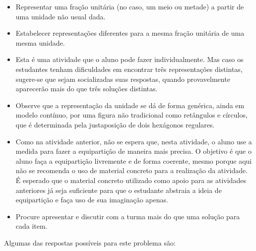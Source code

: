 \begin{atividade}\label{chap1-ativ9}
\objetivos
\begin{itemize} %
    \item       Representar uma fração unitária (no caso, um meio ou metade) a partir de uma unidade não usual dada.
    \item       Estabelecer representações diferentes para a mesma fração unitária de uma mesma unidade.
\end{itemize} %

\discussoes
\begin{itemize} %
   \item Esta é uma atividade que o aluno pode fazer individualmente. Mas caso os estudantes tenham dificuldades em encontrar três representações distintas, sugere-se que sejam socializadas suas respostas, quando provavelmente aparecerão mais do que três soluções distintas.
   \item Observe que a representação da unidade se dá de forma genérica, ainda em modelo contínuo, por uma figura não tradicional como retângulos e círculos, que é determinada pela justaposição de dois hexágonos regulares.
   \item       Como na atividade anterior, não se espera que, nesta atividade, o aluno use a medida para fazer a equipartição de maneira mais precisa. O objetivo é que o aluno faça a equipartição livremente e de forma coerente,  mesmo porque aqui não se recomenda o uso de material concreto para a realização da atividade. É esperado que o material concreto utilizado como apoio para as atividades anteriores já seja suficiente para que o estudante abstraia a ideia de equipartição e faça uso de sua imaginação apenas.
   \item Procure apresentar e discutir com a turma mais do que uma solução para cada item.
\end{itemize} %

\solucao
Algumas das respostas possíveis para este problema são:
\begin{center}
\hspace{.2cm}


\end{center}
\end{atividade}
